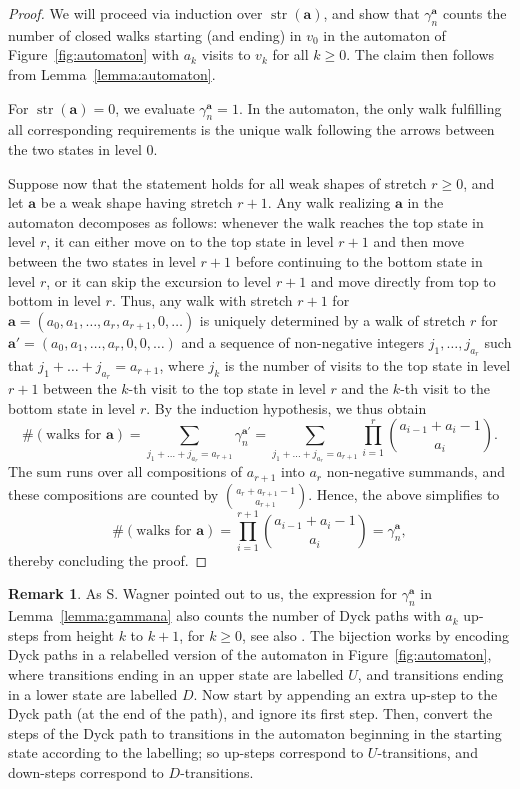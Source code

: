\documentclass[a4paper,11pt,reqno]{amsart}
\newcommand{\mb}{\mathbf}
\newcommand{\str}{\operatorname{str}}
\theoremstyle{definition}
\newtheorem{remark}[lemma]{Remark}
\begin{document}
\begin{proof}
 We will proceed via induction over $\str(\mb a)$, and show that $\gamma_n^{\mb a}$ counts the number of closed walks starting (and ending) in $v_0$ in the automaton of Figure~\ref{fig:automaton} with $a_k$ visits to $v_k$ for all $k \geq 0$. The claim then follows from Lemma~\ref{lemma:automaton}. 
 
 For $\str(\mb a)=0$, we evaluate $\gamma_n^{\mb a} = 1$.
 In the automaton, the only walk fulfilling all corresponding requirements is the unique walk following the arrows between the two states in level 0. 
 
 Suppose now that the statement holds for all weak shapes of stretch $r\geq0$, and let $\mb a$ be a weak shape having stretch $r+1$. Any walk realizing $\mb a$ in the automaton decomposes as follows: whenever the walk reaches the top state in level $r$, it can either move on to the top state in level $r+1$ and then move between the two states in level $r+1$ before continuing to the bottom state in level $r$, or it can skip the excursion to level $r+1$ and move directly from top to bottom in level $r$. Thus, any walk with stretch $r+1$ for $\mb a=(a_0,a_1,\dots,a_r,a_{r+1},0,\dots)$ is uniquely determined by a walk of stretch $r$ for $\mb{a'}=(a_0,a_1,\dots,a_r,0,0,\dots)$ and a sequence of non-negative integers $j_1,\dots,j_{a_r}$ such that $j_1+\dots+j_{a_r}=a_{r+1}$, where $j_k$ is the number of visits to the top state in level $r+1$ between the $k$-th visit to the top state in level $r$ and the $k$-th visit to the bottom state in level $r$. By the induction hypothesis, we thus obtain
 \[
  \#(\text{walks for }\mb a) 
  = \sum_{j_1+\dots+j_{a_r}=a_{r+1}} \gamma_n^{\mb{a'}}
  = \sum_{j_1+\dots+j_{a_r}=a_{r+1}} \prod_{i=1}^r \binom{a_{i-1}+a_i-1}{a_i}.
 \]
 The sum runs over all compositions of $a_{r+1}$ into $a_r$ non-negative summands, and these compositions are counted by $\binom{a_r+a_{r+1}-1}{a_{r+1}}$. Hence, the above simplifies to
 \[
  \#(\text{walks for }\mb a) = \prod_{i=1}^{r+1} \binom{a_{i-1}+a_i-1}{a_i} = \gamma_n^{\mb a},
 \]
 thereby concluding the proof.
\end{proof}

\begin{remark}
 As S. Wagner pointed out to us, the expression for $\gamma_n^{\mb a}$ in Lemma~\ref{lemma:gammana} also counts the number of Dyck paths with $a_k$ up-steps from height $k$ to $k+1$, for $k\geq0$, see also \cite[Proposition 10]{Flajolet80}. The bijection works by encoding Dyck paths in a relabelled version of the automaton in Figure~\ref{fig:automaton}, where transitions ending in an upper state are labelled $U$, and transitions ending in a lower state are labelled $D$. Now start by appending an extra up-step to the Dyck path (at the end of the path), and ignore its first step. Then, convert the steps of the Dyck path to transitions in the automaton beginning in the starting state according to the labelling; so up-steps correspond to $U$-transitions, and down-steps correspond to $D$-transitions. 
\end{remark}
\end{document}
